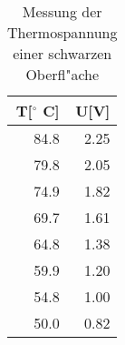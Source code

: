 \begin{table}
\begin{center}
\begin{tabular}{r|r}
T[$^\circ$ C] & U[V] \\
\hline
84.8 & 2.25 \\
79.8 & 2.05 \\
74.9 & 1.82 \\
69.7 & 1.61 \\
64.8 & 1.38 \\
59.9 & 1.20 \\
54.8 & 1.00 \\
50.0 & 0.82 \\
\end{tabular}
\caption[Thermospannung]{Messung der Thermospannung einer schwarzen Oberfl"ache}
\label{schwarz}
\end{center}
\end{table}
